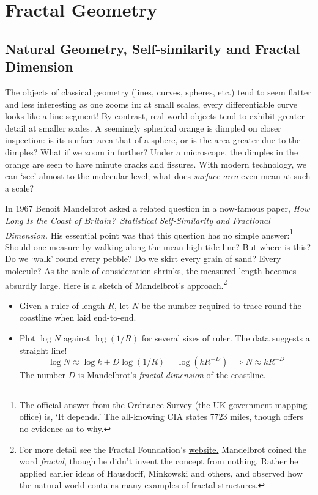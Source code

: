 \graphicspath{{5Fractals/asy/}}

\section{Fractal Geometry}

\subsection{Natural Geometry, Self-similarity and Fractal Dimension}\label{sec:fracdefn}

The objects of classical geometry (lines, curves, spheres, etc.) tend to seem flatter and less interesting as one zooms in: at small scales, every differentiable curve looks like a line segment! By contrast, real-world objects tend to exhibit greater detail at smaller scales. A seemingly spherical orange is dimpled on closer inspection: is its surface area that of a sphere, or is the area greater due to the dimples? What if we zoom in further? Under a microscope, the dimples in the orange are seen to have minute cracks and fissures. With modern technology, we can `see' almost to the molecular level; what does \emph{surface area} even mean at such a scale?

 In 1967 Benoit Mandelbrot asked a related question in a now-famous paper, \emph{How Long Is the Coast of Britain?\ Statistical Self-Similarity and Fractional Dimension.} His essential point was that this question has no simple answer:\footnote{%
	The official answer from the Ordnance Survey (the UK government mapping office) is, `It depends.' The all-knowing CIA states 7723 miles, though offers no evidence as to why.%
} Should one measure by walking along the mean high tide line? But where is this? Do we `walk' round every pebble? Do we skirt every grain of sand? Every molecule? As the scale of consideration shrinks, the measured length becomes absurdly large. Here is a sketch of Mandelbrot's approach.\footnote{%
	For more detail see the Fractal Foundation's \href{http://fractalfoundation.org/OFC/OFC-10-4.html}{website.} Mandelbrot coined the word \emph{fractal}, though he didn't invent the concept from nothing. Rather he applied earlier ideas of Hausdorff, Minkowski and others, and observed how the natural world contains many examples of fractal structures.%
}
\begin{itemize}
  \item Given a ruler of length $R$, let $N$ be the number required to trace round the coastline when laid end-to-end.
  \item Plot $\log N$ against $\log (1/R)$ for several sizes of ruler. The data suggests a straight line!
  \[
  	\log N\approx \log k+D\log(1/R)=\log (kR^{-D})\implies N\approx kR^{-D}
  \]
  The number $D$ is Mandelbrot's \emph{fractal dimension} of the coastline.
\end{itemize}

